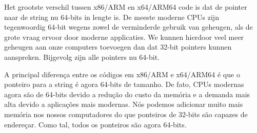 \ifdefined\DUTCH
Het grootste verschil tussen x86/ARM en x64/ARM64 code is dat de pointer naar de string nu 64-bits in lengte is.
De meeste moderne \ac{CPU}s zijn tegenwoordig 64-bit wegens zowel de verminderde gebruik van geheugen, als de grote vraag ervoor door moderne applicaties.
We kunnen hierdoor veel meer geheugen aan onze computers toevoegen dan dat 32-bit pointers kunnen aanspreken.
Bijgevolg zijn alle pointers nu 64-bit.
\fi

\ifdefined\BRAZILIAN
A principal diferença entre os códigos em x86/ARM e x64/ARM64 é que o ponteiro para a string é agora 64-bits de tamanho.
De fato, \ac{CPU}s modernas agora são de 64-bits devido a redução do custo da memória e a demanda mais alta devido a aplicações mais modernas.
Nós podemos adicionar muito mais memória nos nossos computadores do que ponteiros de 32-bits são capazes de endereçar.
Como tal, todos os ponteiros são agora 64-bits.
\fi

\ifdefined\IncludeExercises

\fi
